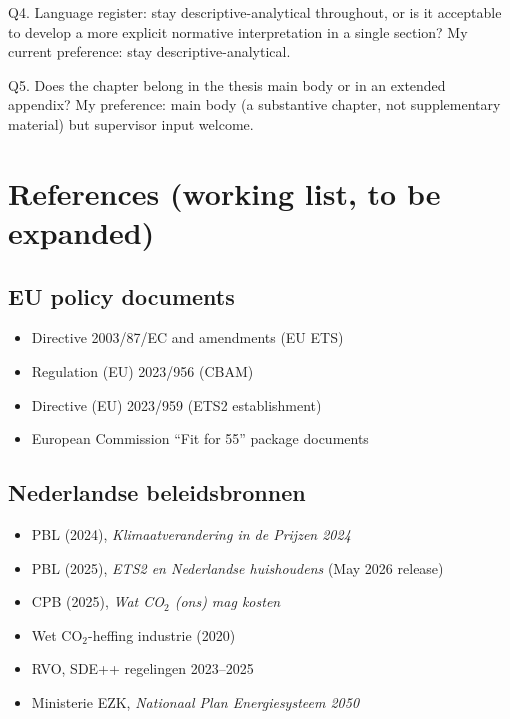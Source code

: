 \documentclass[11pt,a4paper]{article}
\begin{document}
\begin{openquestion}
Q4. Language register: stay descriptive-analytical throughout, or is it acceptable to develop a more explicit normative interpretation in a single section? My current preference: stay descriptive-analytical.
\end{openquestion}

\begin{openquestion}
Q5. Does the chapter belong in the thesis main body or in an extended appendix? My preference: main body (a substantive chapter, not supplementary material) but supervisor input welcome.
\end{openquestion}

\section{References (working list, to be expanded)}

\subsection{EU policy documents}
\begin{itemize}
  \item Directive 2003/87/EC and amendments (EU ETS)
  \item Regulation (EU) 2023/956 (CBAM)
  \item Directive (EU) 2023/959 (ETS2 establishment)
  \item European Commission ``Fit for 55'' package documents
\end{itemize}

\subsection{Nederlandse beleidsbronnen}
\begin{itemize}
  \item PBL (2024), \emph{Klimaatverandering in de Prijzen 2024}
  \item PBL (2025), \emph{ETS2 en Nederlandse huishoudens} (May 2026 release)
  \item CPB (2025), \emph{Wat CO$_2$ (ons) mag kosten}
  \item Wet CO$_2$-heffing industrie (2020)
  \item RVO, SDE++ regelingen 2023--2025
  \item Ministerie EZK, \emph{Nationaal Plan Energiesysteem 2050}
\end{itemize}
\end{document}

